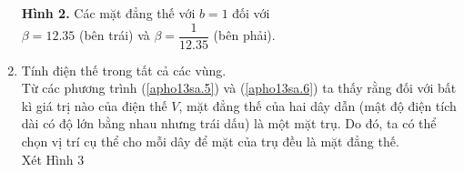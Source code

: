 \begin{loigiai}
\begin{enumerate}[1)]
\begin{center}
\begin{tikzpicture}[x=0.75pt,y=0.75pt,yscale=-1,xscale=1]
\end{tikzpicture}
    \end{center}
    \begin{center}
        \textbf{Hình 2.} Các mặt đẳng thế với $b=1$ đối với\\ $\beta=12.35$ (bên trái) và $\beta=\dfrac{1}{12.35}$ (bên phải).
    \end{center}
    \item Tính điện thế trong tất cả các vùng.\\
    Từ các phương trình (\ref{apho13sa.5}) và (\ref{apho13sa.6}) ta thấy rằng đối với bất kì giá trị nào của điện thế $V$, mặt đẳng thế của hai dây dẫn (mật độ điện tích dài có độ lớn bằng nhau nhưng trái dấu) là một mặt trụ. Do đó, ta có thể chọn vị trí cụ thể cho mỗi dây để mặt của trụ đều là mặt đẳng thế.\\
    Xét Hình $3$
    \begin{center}



\begin{tikzpicture}[x=0.75pt,y=0.75pt,yscale=-1,xscale=1]


\end{tikzpicture}
\end{center}
\end{enumerate}
\end{loigiai}
